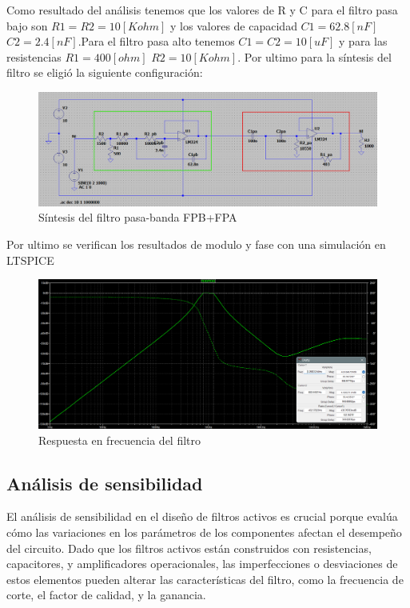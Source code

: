 \documentclass[12pt]{article}
\begin{document}
	Como resultado del análisis tenemos que los valores de R y C para el filtro pasa bajo son $R1=R2=10[Kohm]$ y los valores de capacidad $C1=62.8[nF]$ $C2=2.4[nF]$.Para el filtro pasa
	alto tenemos $C1=C2=10[uF]$ y para las resistencias $R1=400[ohm]$ $R2=10[Kohm]$. Por ultimo para 
	la síntesis del filtro se eligió la siguiente configuración: 
	  
	\begin{figure}[h!]
		\includegraphics[width=1\linewidth]{Simulaciones_Imagenes/Circ_Filtro_VerdeFpb_RojoFpa}
		\caption[Síntesis del filtro pasa-banda]{Síntesis del filtro pasa-banda FPB+FPA}
		\label{fig:circfiltroverdefpbrojofpa}
	\end{figure}
	
	Por ultimo se verifican los resultados de modulo y fase con una simulación en LTSPICE
	\begin{figure}[h!]
		\includegraphics[width=1\linewidth]{Simulaciones_Imagenes/Sim_AC_Filtro}
		\caption[Respuesta en frecuencia del filtro]{Respuesta en frecuencia del filtro}
		\label{fig:simacfiltro}
	\end{figure}\newpage
	
	\subsection{Análisis de sensibilidad}
	El análisis de sensibilidad en el diseño de filtros activos es crucial porque evalúa cómo las variaciones en los parámetros de los componentes afectan el desempeño del circuito. Dado que los filtros activos están construidos con resistencias, capacitores, y amplificadores operacionales, las imperfecciones o desviaciones de estos elementos pueden alterar las características del filtro, como la frecuencia de corte, el factor de calidad, y la ganancia.
	
\end{document}
